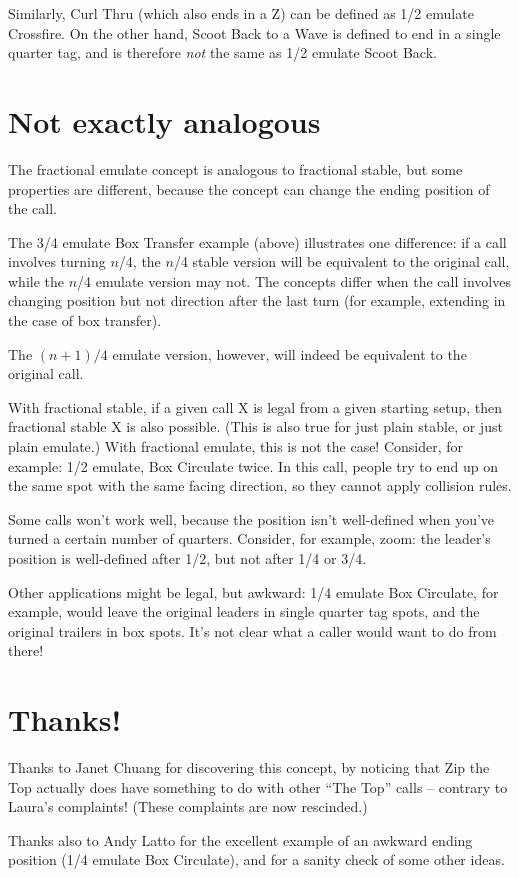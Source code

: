\documentclass[11pt]{article}
\begin{document}
\vspace{0.5cm}

Similarly, Curl Thru (which also ends in a Z) can be defined
as 1/2 emulate Crossfire.
On the other hand, Scoot Back to a Wave
is defined to end in a single quarter tag,
and is therefore {\em not} the same as 1/2 emulate Scoot Back.

\section{Not exactly analogous}
\label{sec:nonanalogy}

The fractional emulate concept is analogous to fractional stable,
but some properties are different,
because the concept can change the ending position of the call.

The 3/4 emulate Box Transfer example (above) illustrates one difference:
if a call involves turning $n$/4, the $n$/4 stable
version will be equivalent to the original call, while the $n$/4
emulate version may not. The concepts differ when the call involves
changing position but not direction after the last turn (for example,
extending in the case of box transfer).

The $(n+1)/4$ emulate version, however,
will indeed be equivalent to the original call.

With fractional stable,
if a given call X is legal from a given starting setup,
then fractional stable X is also possible.
(This is also true for just plain stable, or just plain emulate.)
With fractional emulate, this is not the case!
Consider, for example: 1/2 emulate, Box Circulate twice.
In this call, people try to end up on the same spot
with the same facing direction,
so they cannot apply collision rules.

Some calls won't work well, because the position isn't well-defined
when you've turned a certain number of quarters.  Consider, for
example, zoom: the leader's position is well-defined after 1/2, but
not after 1/4 or 3/4.

Other applications might be legal, but awkward:
1/4 emulate Box Circulate, for example,
would leave the original leaders in single quarter tag spots,
and the original trailers in box spots.
It's not clear what a caller would want to do from there!


\section{Thanks!}

Thanks to Janet Chuang for discovering this concept,
by noticing that Zip the Top actually does have something to do
with other ``The Top'' calls -- contrary to Laura's complaints!
(These complaints are now rescinded.)

Thanks also to Andy Latto for the excellent example
of an awkward ending position (1/4 emulate Box Circulate),
and for a sanity check of some other ideas.
\end{document}
